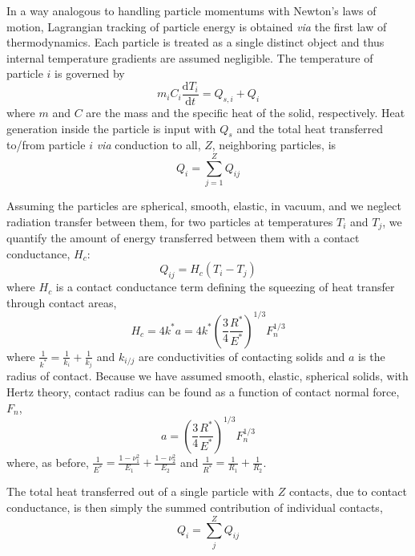 \documentclass[11pt]{report} %
\begin{document}
In a way analogous to handling particle momentums with Newton's laws of motion, Lagrangian tracking of particle energy is obtained \textit{via} the first law of thermodynamics. Each particle is treated as a single distinct object and thus internal temperature gradients are assumed negligible. The temperature of particle $i$ is governed by
\begin{equation}\label{eq:thermoFirstLaw}
	m_iC_i\frac{\mathrm{d}T_i}{\mathrm{d}t} = Q_{s,i} + Q_{i}
\end{equation}
where $m$ and $C$ are the mass and the specific heat of the solid, respectively. Heat generation inside the particle is input with $Q_{s}$ and the total heat transferred to/from particle $i$ \textit{via} conduction to all, $Z$, neighboring particles, is
\begin{equation}
	Q_i = \sum_{j=1}^Z Q_{ij}
\end{equation}

Assuming the particles are spherical, smooth, elastic, in vacuum, and we neglect radiation transfer between them, for two particles at temperatures $T_i$ and $T_j$, we quantify the amount of energy transferred between them with a contact conductance, $H_c$:
\begin{equation}\label{eq:pebble-conduction-heat-transfer}
    Q_{ij} = H_{c}(T_i - T_j)
\end{equation}
where $H_c$ is a contact conductance term defining the squeezing of heat transfer through contact areas,\cite{Batchelor1977,Cheng19994199}
\begin{equation}\label{eq:cheng-modification-batchelor}
    H_c = 4k^*a = 4k^* \left(\frac{3}{4}\frac{R^*}{E^*}\right)^{1/3}F_n^{1/3}
\end{equation}
where $\frac{1}{k^*} = \frac{1}{k_i} + \frac{1}{k_j}$ and $k_{i/j}$ are conductivities of contacting solids and $a$ is the radius of contact. Because we have assumed smooth, elastic, spherical solids, with Hertz theory, contact radius can be found as a function of contact normal force, $F_n$,
\begin{equation}
    a =  \left(\frac{3}{4}\frac{R^*}{E^*}\right)^{1/3}F_n^{1/3} 
\end{equation}
where, as before, $\frac{1}{E^*} = \frac{1-\nu_1^2}{E_1} + \frac{1-\nu_2^2}{E_2}$ and $\frac{1}{R^*} = \frac{1}{R_1} + \frac{1}{R_2}$. 

The total heat transferred out of a single particle with $Z$ contacts, due to contact conductance, is then simply the summed contribution of individual contacts, 
\begin{equation}
    Q_i = \sum_j^Z Q_{ij}
\end{equation}
\end{document}
